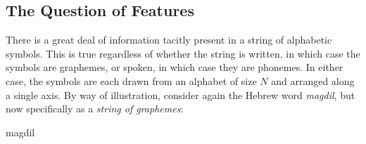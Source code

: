 	 \subsection{The Question of Features} There is a great deal of information tacitly present in a string of alphabetic symbols.
	 This is true regardless of whether the string is written, in which case the symbols are graphemes, or spoken,
	 in which case they are phonemes. In either case, the symbols are each drawn from an alphabet of size $N$ and arranged along a single axis.
By way of illustration, consider again the Hebrew word \textit{magdil}, but now specifically as a \emph{string of graphemes}: 
\begin{center}
magdil
\end{center}
